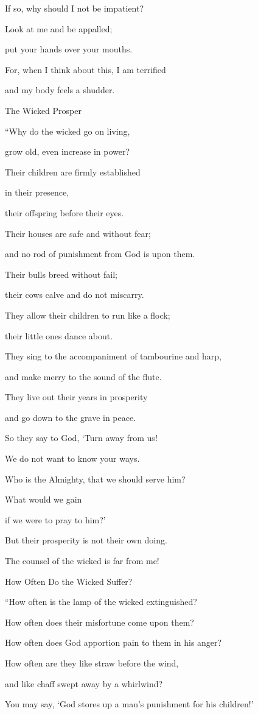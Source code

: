{\par }{\Q If
so, why
should I not
be impatient?
\par }{\Q {}Look
at me
and be appalled;
\par }{\Q put
your hands
over
your mouths.
\par }{\Q {}For, when I think
about this, I am terrified
\par }{\Q and my body
feels
a shudder.
\par }{\SH The Wicked Prosper
\par }{\Q {}“Why
do the wicked
go on living,
\par }{\Q grow
old, even
increase
in power?
\par }{\Q {}Their children
are firmly established
\par }{\Q in their presence,
\par }{\Q their offspring
before their eyes.
\par }{\Q {}Their houses
are safe
and without fear;
\par }{\Q and no
rod
of punishment from God
is upon them.
\par }{\Q {}Their bulls
breed without fail;

\par }{\Q their
cows
calve
and do not
miscarry.
\par }{\Q {}They allow
their children
to run like a flock;
\par }{\Q their little ones
dance about.
\par }{\Q {}They sing
to the accompaniment of tambourine
and harp,
\par }{\Q and make merry
to the sound
of the flute.
\par }{\Q {}They live out
their years
in prosperity
\par }{\Q and go down
to the grave
in peace.
\par }{\Q {}So they say
to God,
‘Turn
away from us!
\par }{\Q We do not
want
to know
your ways.
\par }{\Q {}Who is the Almighty,
that
we should
serve
him?
\par }{\Q What
would we gain
\par }{\Q if
we were to pray to him?’
\par }{\Q {}But their prosperity
is not their own doing.
\par }{\Q The counsel
of the wicked
is far
from me!
\par }{\SH How Often Do the Wicked Suffer?
\par }{\Q {}“How
often is the lamp
of the wicked
extinguished?
\par }{\Q How often does their misfortune
come
upon
them?
\par }{\Q How often does God apportion
pain to them
in his anger?
\par }{\Q {}How often are they like straw
before
the wind,
\par }{\Q and like chaff
swept away by a whirlwind?
\par }{\Q {}You may say, ‘God
stores
up a man’s
punishment for
his children!’

}
